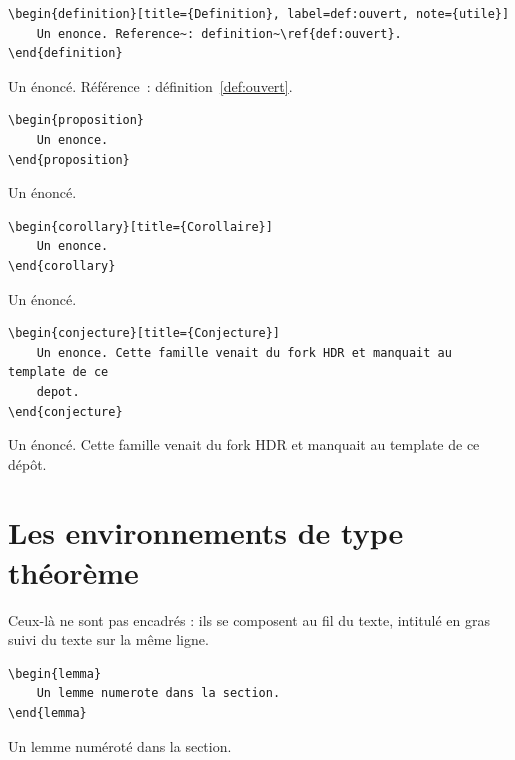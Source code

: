 \begin{lstlisting}
\begin{definition}[title={Definition}, label=def:ouvert, note={utile}]
    Un enonce. Reference~: definition~\ref{def:ouvert}.
\end{definition}
\end{lstlisting}
\begin{definition}[title={Définition}, label=def:ouvert, note={utile}]
    Un énoncé. Référence~: définition~\ref{def:ouvert}.
\end{definition}

\begin{lstlisting}
\begin{proposition}
    Un enonce.
\end{proposition}
\end{lstlisting}
\begin{proposition}
    Un énoncé.
\end{proposition}

\begin{lstlisting}
\begin{corollary}[title={Corollaire}]
    Un enonce.
\end{corollary}
\end{lstlisting}
\begin{corollary}[title={Corollaire}]
    Un énoncé.
\end{corollary}

\begin{lstlisting}
\begin{conjecture}[title={Conjecture}]
    Un enonce. Cette famille venait du fork HDR et manquait au template de ce
    depot.
\end{conjecture}
\end{lstlisting}
\begin{conjecture}[title={Conjecture}]
    Un énoncé. Cette famille venait du fork HDR et manquait au template de ce
    dépôt.
\end{conjecture}

\section{Les environnements de type théorème}%
\label{sec:theoremlike}

Ceux-là ne sont pas encadrés : ils se composent au fil du texte, intitulé en
gras suivi du texte sur la même ligne.

\begin{lstlisting}
\begin{lemma}
    Un lemme numerote dans la section.
\end{lemma}
\end{lstlisting}
\begin{lemma}
    Un lemme numéroté dans la section.
\end{lemma}

